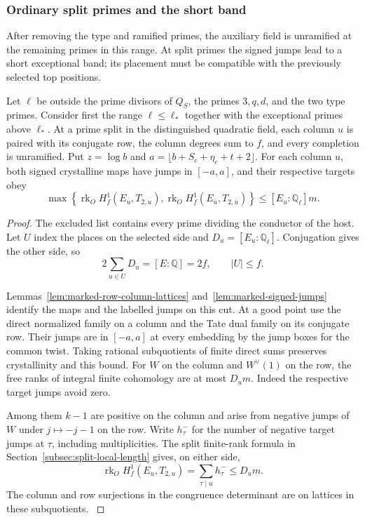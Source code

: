 \subsubsection*{Ordinary split primes and the short band}
\label{subsec:ordinary-split-length}
\hypertarget{source-unramified-split-length}{}

After removing the type and ramified primes, the auxiliary field is unramified at the remaining primes in this range. At split primes the signed jumps lead to a short exceptional band; its placement must be compatible with the previously selected top positions.

\begin{established}\label{hyp:unramified-split-row}
Let \(\ell\) be outside the prime divisors of \(Q_S\), the primes
\(3,q,d\), and the two type primes. Consider first the range
\(\ell\le\ell_*\) together with the exceptional primes above
\(\ell_*\). At a prime split in the distinguished quadratic field, each column \(u\) is paired with its conjugate row, the column degrees sum to \(f\), and every completion is unramified. Put \(z=\log b\) and \(a=\lfloor b+S_c+\eta_c+t+2\rfloor\). For each column \(u\), both signed crystalline maps have jumps in \([-a,a]\), and their respective targets obey
\[
 \max\left\{\operatorname{rk}_O H^1_f(E_u,T_{2,u}),
          \operatorname{rk}_O H^1_f(E_{\bar u},T_{2,\bar u})\right\}
               \le [E_u:\mathbb Q_\ell]m .
\]
\end{established}
\begin{proof}
The excluded list contains every prime dividing the conductor of the host. Let \(U\) index the places on the selected side and \(D_u=[E_u:\mathbb Q_\ell]\). Conjugation gives the other side, so
\[
 2\sum_{u\in U}D_u=[E:\mathbb Q]=2f,\qquad |U|\le f .
\]

Lemmas~\ref{lem:marked-row-column-lattices} and~\ref{lem:marked-signed-jumps} identify the maps and the labelled jumps on this cut. At a good point use the direct normalized family on a column and
the Tate dual family on its conjugate row. Their jumps are in
\([-a,a]\) at every embedding by the jump boxes for the common
twist. Taking rational subquotients of finite direct sums preserves
crystallinity and this bound. For \(W\) on the column and
\(W^\vee(1)\) on the row, the free ranks of integral finite
cohomology are at most \(D_um\). Indeed the respective target
jumps avoid zero.

Among them \(k-1\) are positive on the column
and arise from negative jumps of \(W\) under \(j\mapsto-j-1\)
on the row. Write \(h_\tau^-\) for the number of negative target jumps at \(\tau\), including multiplicities. The split finite-rank formula in Section~\ref{subsec:split-local-length} gives, on either side,
\[
 \operatorname{rk}_O H^1_f(E_u,T_{2,u})=\sum_{\tau\mid u}h_\tau^-
                        \le D_um .
\] The column and row surjections in the congruence determinant
are on lattices in these subquotients. \label{cor:unramified-split-length-1}
\end{proof}

